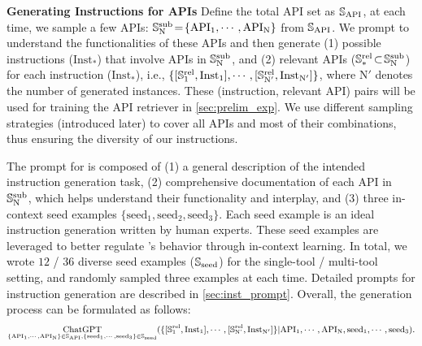 \textbf{Generating Instructions for APIs} \quad
Define the total API set as ${\mathbb{S}}_\text{API}$, at each time, we sample a few APIs: ${\mathbb{S}}_\text{N}^{\text{sub}} \!=\! \{\text{API}_1, \cdots, \text{API}_\text{N}\}$ from ${\mathbb{S}}_\text{API}$. We prompt \turbo to understand the functionalities of these APIs and then generate (1) possible instructions ($\text{Inst}_*$) that involve APIs in ${\mathbb{S}}_\text{N}^{\text{sub}}$, and (2) relevant APIs (${\mathbb{S}}_*^{\text{rel}} \!\subset\!{\mathbb{S}}_\text{N}^{\text{sub}}$) for each instruction ($\text{Inst}_*$), i.e., $\{[{\mathbb{S}}_1^{\text{rel}}, \text{Inst}_1], \cdots, [{\mathbb{S}}_{\text{N}'}^{\text{rel}}, \text{Inst}_{\text{N}'}]\}$, where $\text{N}'$ denotes the number of generated instances.
These (instruction, relevant API) pairs will be used for training the API retriever in \cref{sec:prelim_exp}.
We use different sampling strategies (introduced later) to cover all APIs and most of their combinations, thus ensuring the diversity of our instructions.

The prompt for \turbo is composed of (1) a general description of the intended instruction generation task, (2) comprehensive documentation of each API in ${\mathbb{S}}_\text{N}^{\text{sub}}$, which helps \turbo understand their functionality and interplay, and (3) three in-context seed examples $\{\text{seed}_1, \text{seed}_2, \text{seed}_3\}$. Each seed example is an ideal instruction generation written by human experts. These seed examples are leveraged to better regulate \turbo's behavior through in-context learning. In total, we wrote $12$ / $36$ diverse seed examples (${\mathbb{S}}_\text{seed}$) for the single-tool / multi-tool setting, and randomly sampled three examples at each time. Detailed prompts for instruction generation are described in \cref{sec:inst_prompt}. Overall, the generation process can be formulated as follows:
\begin{equation}
    \small
    \begin{aligned}
    \underset{\{\text{API}_1, \cdots, \text{API}_\text{N}\} \in \sS_{\text{API}}, \{\text{seed}_1, \cdots, \text{seed}_3\} \in \sS_\text{seed}}{\text{\turbo}}(\{[\sS_1^{\text{rel}}, \text{Inst}_1], \cdots, [\sS_{\text{N'}}^{\text{rel}}, \text{Inst}_{\text{N}'}]\} | \text{API}_1, \cdots, \text{API}_\text{N}, \text{seed}_1, \cdots, \text{seed}_3).
        \nonumber
    \end{aligned}
    \label{eq:instruction_generation}
\end{equation}



